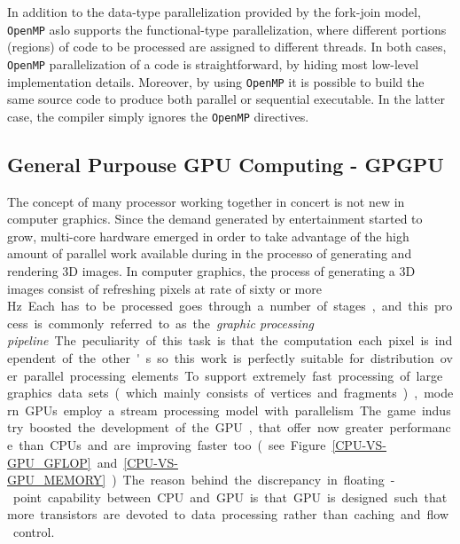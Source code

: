     In addition to the data-type parallelization provided by the
    fork-join model, \texttt{OpenMP} aslo supports the functional-type
    parallelization, where different portions (regions) of code to be
    processed are assigned to different threads. In both cases, \texttt{OpenMP}
    parallelization of a code is straightforward, by hiding most
    low-level implementation details. Moreover, by using \texttt{OpenMP} it is
    possible to build the same source code to produce both parallel or
    sequential executable. In the latter case, the compiler simply
    ignores the \texttt{OpenMP} directives.
    
    
    \subsection{General Purpouse GPU Computing - GPGPU}
    The concept of many processor working together in concert is not new in computer graphics. Since the demand generated by entertainment started to grow, multi-core hardware emerged in order to take advantage of the high amount of parallel work available during in the processo of generating and rendering 3D images.
    In computer graphics, the process of generating a 3D images consist of
    refreshing pixels at rate of sixty or more \SI{Hz}. Each has to be processed goes through a number of stages, and this process is commonly referred to as the \emph{graphic processing pipeline}. The peculiarity of this task is that the  computation each pixel is independent of the other's so this work is perfectly suitable for distribution over parallel processing elements. To support extremely fast processing of large graphics data sets (which mainly consists of vertices and fragments), modern GPUs employ a stream processing model with parallelism.
    The game industry boosted the development of the GPU, that offer now greater
    performance than CPUs and are improving faster too (see Figure
    \ref{CPU-VS-GPU_GFLOP} and \ref{CPU-VS-GPU_MEMORY}).
    The reason behind the discrepancy in floating-point capability between CPU and  GPU is that GPU is designed such that more transistors are devoted to data  processing rather than caching and flow control.
    

